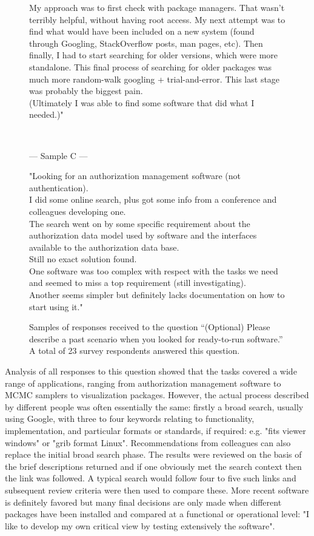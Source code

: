 \documentclass{casicswhitepaper}
\begin{document}
\begin{figure}[t]
\begin{minipage}{5.5in}
My approach was to first check with package managers.  That wasn't terribly helpful, without having root access.  My next attempt was to find what would have been included on a new system (found through Googling, StackOverflow posts, man pages, etc). Then finally, I had to start searching for older versions, which were more standalone.  This final process of searching for older packages was much more random-walk googling + trial-and-error.  This last stage was probably the biggest pain.\\

(Ultimately I was able to find some software that did what I needed.)"  \end{minipage}\\
  \vspace*{1.5ex}
  \begin{minipage}{5.5in}
    \begin{center}
      --- Sample C ---
    \end{center}
"Looking for an authorization management software (not authentication).\\
I did some online search, plus got some info from a conference and colleagues developing one.\\
The search went on by some specific requirement about the authorization data model used by software and the interfaces available to the authorization data base.\\
Still no exact solution found.\\
One software was too complex with respect with the tasks we need and seemed to miss a top requirement (still investigating).\\
Another seems simpler but definitely lacks documentation on how to start using it."
  \end{minipage}
  \caption{Samples of responses received to the question ``(Optional) Please describe a past scenario when you looked for ready-to-run software.''  A total of 23 survey respondents answered this question.}
  \label{sample-responses}
\end{figure}  

Analysis of all responses to this question showed that the tasks covered a wide range of applications, ranging from authorization management software to MCMC samplers to visualization packages. However, the actual process described by different people was often essentially the same: firstly a broad search, usually using Google, with three to four keywords relating to functionality, implementation, and particular formats or standards, if required: e.g. "fits viewer windows" or "grib format Linux". Recommendations from colleagues can also replace the initial broad search phase. The results were reviewed on the basis of the brief descriptions returned and if one obviously met the search context then the link was followed. A typical search would follow four to five such links and subsequent review criteria were then used to compare these. More recent software is definitely favored but many final decisions are only made when different packages have been installed and compared at a functional or operational level: "I like to develop my own critical view by testing extensively the software".
\end{document}
